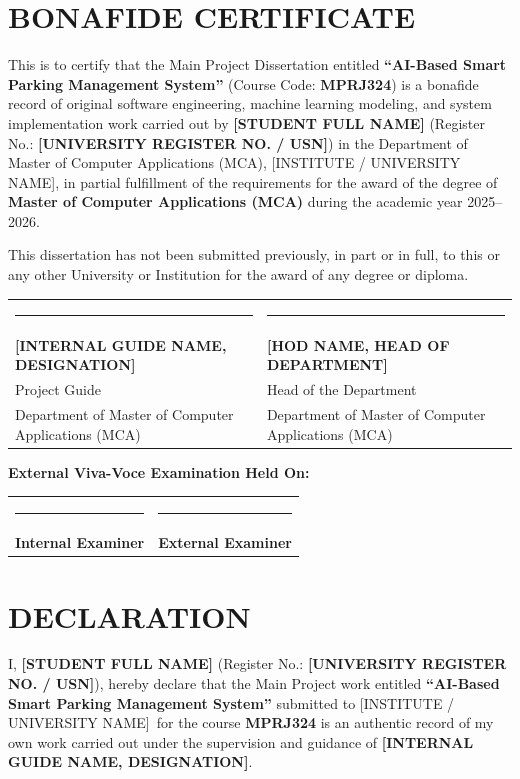 \documentclass[12pt,a4paper,oneside]{report}
\newcommand{\studentname}{[STUDENT FULL NAME]}
\newcommand{\studentusn}{[UNIVERSITY REGISTER NO. / USN]}
\newcommand{\guidename}{[INTERNAL GUIDE NAME, DESIGNATION]}
\newcommand{\hodname}{[HOD NAME, HEAD OF DEPARTMENT]}
\newcommand{\collegename}{[INSTITUTE / UNIVERSITY NAME]}
\newcommand{\deptname}{Department of Master of Computer Applications (MCA)}
\newcommand{\academicyear}{2025--2026}
\begin{document}
\chapter*{BONAFIDE CERTIFICATE}

This is to certify that the Main Project Dissertation entitled \textbf{``AI-Based Smart Parking Management System''} (Course Code: \textbf{MPRJ324}) is a bonafide record of original software engineering, machine learning modeling, and system implementation work carried out by \textbf{\studentname} (Register No.: \textbf{\studentusn}) in the \deptname, \collegename, in partial fulfillment of the requirements for the award of the degree of \textbf{Master of Computer Applications (MCA)} during the academic year \academicyear.

This dissertation has not been submitted previously, in part or in full, to this or any other University or Institution for the award of any degree or diploma.

\vspace{2.5cm}
\noindent
\begin{tabularx}{\textwidth}{X X}
  \rule{6cm}{0.6pt} & \rule{6cm}{0.6pt} \\
  \textbf{\guidename} & \textbf{\hodname} \\
  Project Guide & Head of the Department \\
  \deptname & \deptname \\
\end{tabularx}

\vspace{2.2cm}
\noindent
\textbf{External Viva-Voce Examination Held On:} \underline{\hspace{4.5cm}}\\[1.5cm]
\begin{tabularx}{\textwidth}{X X}
  \rule{6cm}{0.6pt} & \rule{6cm}{0.6pt} \\
  \textbf{Internal Examiner} & \textbf{External Examiner} \\
\end{tabularx}
\clearpage

\chapter*{DECLARATION}

I, \textbf{\studentname} (Register No.: \textbf{\studentusn}), hereby declare that the Main Project work entitled \textbf{``AI-Based Smart Parking Management System''} submitted to \collegename\ for the course \textbf{MPRJ324} is an authentic record of my own work carried out under the supervision and guidance of \textbf{\guidename}.
\end{document}

